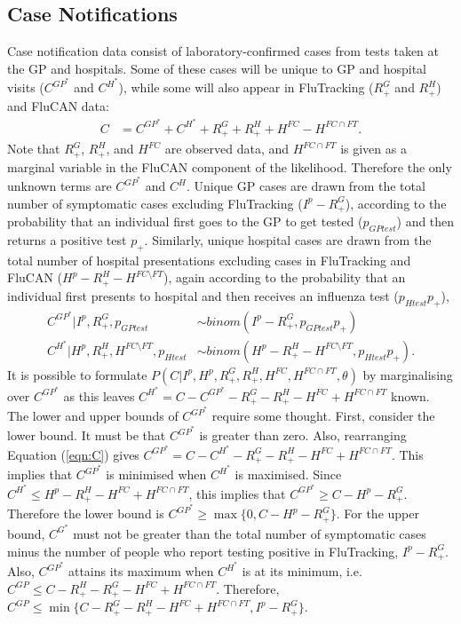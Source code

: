 \subsection{Case Notifications}
Case notification data consist of laboratory-confirmed cases from tests taken at the GP and hospitals. Some of these cases will be unique to GP and hospital visits ($C^{GP^*}$ and $C^{H^*}$), while some will also appear in FluTracking ($R_+^G$ and $R_+^H$) and FluCAN data:
\begin{align} \label{eqn:C}
C &= C^{GP^*} + C^{H^*} + R_+^G  + R_+^H + H^{FC} - H^{FC \cap FT}.
\end{align}
Note that $R_+^G$, $R_+^H$, and $H^{FC}$ are observed data, and $H^{FC \cap FT}$ is given as a marginal variable in the FluCAN component of the likelihood.
Therefore the only unknown terms are $C^{GP^*}$ and $C^{H}$. Unique GP cases are drawn from the total number of symptomatic cases excluding FluTracking ($I^p-R_+^G$), according to the probability that an individual first goes to the GP to get tested ($p_{GPtest}$) and then returns a positive test $p_+$. Similarly, unique hospital cases are drawn from the total number of hospital presentations excluding cases in FluTracking and FluCAN ($H^p-R_+^H-H^{FC \setminus FT}$), again according to the probability that an individual first presents to hospital and then receives an influenza test ($p_{Htest}p_+$),
\begin{align}
C^{GP^*} | I^p, R_+^G, p_{GPtest} &\sim binom(I^p-R_+^G, p_{GPtest}p_+) \\
C^{H^*} | H^p, R_+^H, H^{FC\setminus FT} , p_{Htest} &\sim binom(H^p-R_+^H - H^{FC\setminus FT}, p_{Htest}p_+) .
\end{align}
It is possible to formulate $P(C | I^p, H^p, R_+^G, R_+^H, H^{FC}, H^{FC\cap FT}, \theta)$ by marginalising over $C^{GP^*}$ as this leaves $C^{H^*} = C - C^{GP^*} - R_+^G  - R_+^H - H^{FC} + H^{FC \cap FT}$ known. The lower and upper bounds of $C^{GP^*}$ require some thought. First, consider the lower bound. It must be that $C^{GP^*}$ is greater than zero. Also, rearranging Equation (\ref{eqn:C}) gives $C^{GP^*} = C - C^{H^*} - R_+^G  - R_+^H - H^{FC} + H^{FC \cap FT}$. This implies that $C^{GP^*}$ is minimised when $C^{H^*}$ is maximised. Since $C^{H^*} \leq H^p - R_+^H-H^{FC} + H^{FC\cap FT}$, this implies that $C^{GP^*} \geq C-H^p-R_+^G$. Therefore the lower bound is $C^{GP^*} \geq \max\{0, C-H^p-R_+^G \}$.
For the upper bound, $C^{G^*}$ must not be greater than the total number of symptomatic cases minus the number of people who report testing positive in FluTracking, $I^p-R_+^G$. Also, $C^{GP^*}$ attains its maximum when $C^{H^*}$ is at its minimum, i.e. $C^{GP} \leq C-R_+^H-R_+^G-H^{FC}+H^{FC\cap FT}$. Therefore, $C^{GP} \leq \min\{C-R_+^G-R_+^H-H^{FC}+H^{FC\cap FT}, I^p-R_+^G\}$.\\
